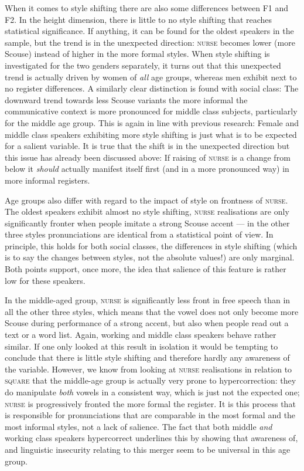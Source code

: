 When it comes to style shifting there are also some differences between F1 and F2.
In the height dimension, there is little to no style shifting that reaches statistical significance.
If anything, it can be found for the oldest speakers in the sample, but the trend is in the unexpected direction: \textsc{nurse} becomes lower (more Scouse) instead of higher in the more formal styles.
When style shifting is investigated for the two genders separately, it turns out that this unexpected trend is actually driven by women of \emph{all} age groups, whereas men exhibit next to no register differences.
A similarly clear distinction is found with social class: The downward trend towards less Scouse variants the more informal the communicative context is more pronounced for middle class subjects, particularly for the middle age group.
This is again in line with previous research: Female and middle class speakers exhibiting more style shifting is just what is to be expected for a salient variable.
It is true that the shift is in the unexpected direction but this issue has already been discussed above: If raising of \textsc{nurse} is a change from below it \emph{should} actually manifest itself first (and in a more pronounced way) in more informal registers.

Age groups also differ with regard to the impact of style on frontness of \textsc{nurse}.
The oldest speakers exhibit almost no style shifting, \textsc{nurse} realisations are only significantly fronter when people imitate a strong Scouse accent --- in the other three styles pronunciations are identical from a statistical point of view.
In principle, this holds for both social classes, the differences in style shifting (which is to say the changes between styles, not the absolute values!) are only marginal.
Both points support, once more, the idea that salience of this feature is rather low for these speakers.

In the middle-aged group, \textsc{nurse} is significantly less front in free speech than in all the other three styles, which means that the vowel does not only become more Scouse during performance of a strong accent, but also when people read out a text or a word list.
Again, working and middle class speakers behave rather similar.
If one only looked at this result in isolation it would be tempting to conclude that there is little style shifting and therefore hardly any awareness of the variable.
However, we know from looking at \textsc{nurse} realisations in relation to \textsc{square} that the middle-age group is actually very prone to hypercorrection: they do manipulate \emph{both} vowels in a consistent way, which is just not the expected one; \textsc{nurse} is progressively fronted the more formal the register.
It is this process that is responsible for pronunciations that are comparable in the most formal and the most informal styles, not a lack of salience.
The fact that both middle \emph{and} working class speakers hypercorrect underlines this by showing that awareness of, and linguistic insecurity relating to this merger seem to be universal in this age group.

